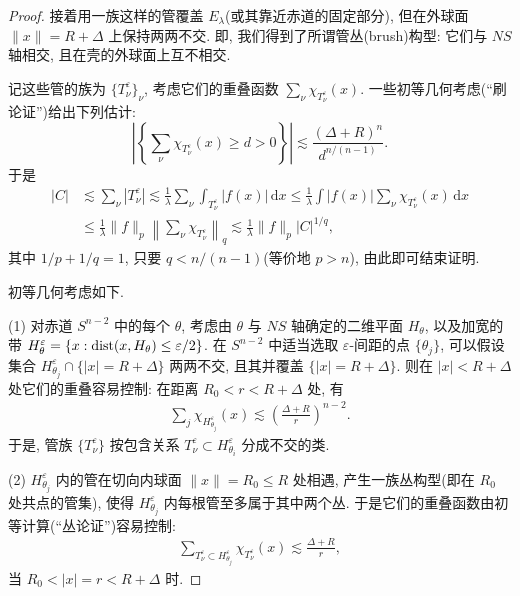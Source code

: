 \begin{proof}
接着用一族这样的管覆盖 $E_\lambda$(或其靠近赤道的固定部分), 但在外球面 $\|x\| = R + \Delta$ 上保持两两不交. 即, 我们得到了所谓管丛(brush)构型: 它们与 $NS$ 轴相交, 且在壳的外球面上互不相交.

记这些管的族为 $\{T_\nu^\varepsilon\}_\nu$, 考虑它们的重叠函数 $\sum_\nu \chi_{T_\nu^\varepsilon}(x)$. 一些初等几何考虑(``刷论证'')给出下列估计:
\begin{equation}\label{eq:6.7}
  \left|\left\{\sum_{\nu}\chi_{T_{\nu}^{\varepsilon}}(x)\geq d>0\right\}\right|
  \lesssim\frac{(\Delta+R)^{n}}{d^{n/(n-1)}}.
\end{equation}
于是
\begin{align*}
  |C|
  &\lesssim\sum_{\nu}|T_{\nu}^{\varepsilon}|
  \lesssim\frac{1}{\lambda}\sum_{\nu}\int_{T_{\nu}^{\varepsilon}}|f(x)|\,\mathrm{d}x
  \leq\frac{1}{\lambda}\int|f(x)|\sum_{\nu}\chi_{T_{\nu}^{\varepsilon}}(x)\,\mathrm{d}x\\
  &\leq\frac{1}{\lambda}\|f\|_{p}\left\|\sum_{\nu}\chi_{T_{\nu}^{\varepsilon}}\right\|_{q}
  \lesssim\frac{1}{\lambda}\|f\|_{p}|C|^{1/q},
\end{align*}
其中 $1/p + 1/q = 1$, 只要 $q < n/(n - 1)$(等价地 $p > n$), 由此即可结束证明.

初等几何考虑如下.

(1) 对赤道 $S^{n-2}$ 中的每个 $\theta$, 考虑由 $\theta$ 与 $NS$ 轴确定的二维平面 $H_\theta$, 以及加宽的带 $H_\theta^\varepsilon = \{x : \operatorname{dist}(x, H_\theta) \leq \varepsilon/2\}$. 在 $S^{n-2}$ 中适当选取 $\varepsilon$-间距的点 $\{\theta_j\}$, 可以假设集合 $H^\varepsilon_{\theta_j} \cap \{|x| = R + \Delta\}$ 两两不交, 且其并覆盖 $\{|x| = R + \Delta\}$. 则在 $|x| < R + \Delta$ 处它们的重叠容易控制: 在距离 $R_0 < r < R + \Delta$ 处, 有
\begin{align*}
  \sum_{j}\chi_{H_{\theta_{j}}^{\varepsilon}}(x)\lesssim\left(\frac{\Delta+R}{r}\right)^{n-2}.
\end{align*}
于是, 管族 $\{T_\nu^\varepsilon\}$ 按包含关系 $T_\nu^\varepsilon \subset H_{\theta_i}^\varepsilon$ 分成不交的类.

(2) $H_{\theta_j}^{\varepsilon}$ 内的管在切向内球面 $\|x\| = R_0 \leq R$ 处相遇, 产生一族丛构型(即在 $R_0$ 处共点的管集), 使得 $H_{\theta_j}^{\varepsilon}$ 内每根管至多属于其中两个丛. 于是它们的重叠函数由初等计算(``丛论证'')容易控制:
\begin{align*}
  \sum_{T_{\nu}^{\varepsilon}\subset H_{\theta_{j}}^{\varepsilon}}\chi_{T_{\nu}^{\varepsilon}}(x)\lesssim\frac{\Delta+R}{r},
\end{align*}
当 $R_0 < |x| = r < R + \Delta$ 时.


\end{proof}
